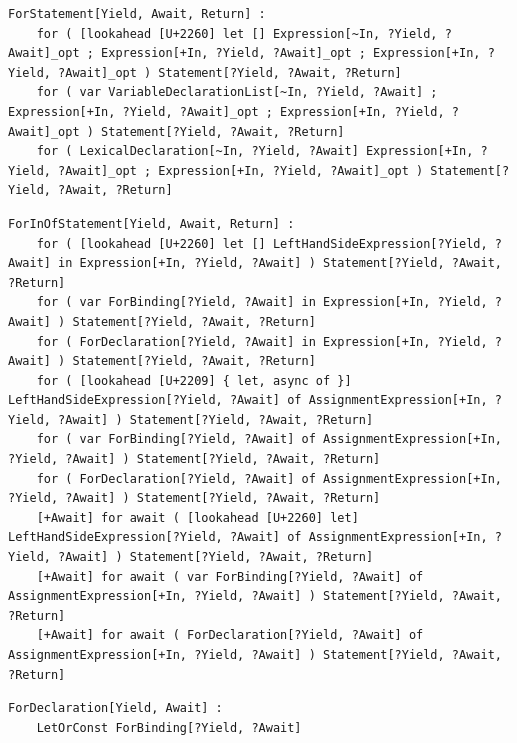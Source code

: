 \noindent\textbf{\texttt{}}\par
\begin{lstlisting}
ForStatement[Yield, Await, Return] :
    for ( [lookahead [U+2260] let [] Expression[~In, ?Yield, ?Await]_opt ; Expression[+In, ?Yield, ?Await]_opt ; Expression[+In, ?Yield, ?Await]_opt ) Statement[?Yield, ?Await, ?Return]
    for ( var VariableDeclarationList[~In, ?Yield, ?Await] ; Expression[+In, ?Yield, ?Await]_opt ; Expression[+In, ?Yield, ?Await]_opt ) Statement[?Yield, ?Await, ?Return]
    for ( LexicalDeclaration[~In, ?Yield, ?Await] Expression[+In, ?Yield, ?Await]_opt ; Expression[+In, ?Yield, ?Await]_opt ) Statement[?Yield, ?Await, ?Return]
\end{lstlisting}

\noindent\textbf{\texttt{}}\par
\begin{lstlisting}
ForInOfStatement[Yield, Await, Return] :
    for ( [lookahead [U+2260] let [] LeftHandSideExpression[?Yield, ?Await] in Expression[+In, ?Yield, ?Await] ) Statement[?Yield, ?Await, ?Return]
    for ( var ForBinding[?Yield, ?Await] in Expression[+In, ?Yield, ?Await] ) Statement[?Yield, ?Await, ?Return]
    for ( ForDeclaration[?Yield, ?Await] in Expression[+In, ?Yield, ?Await] ) Statement[?Yield, ?Await, ?Return]
    for ( [lookahead [U+2209] { let, async of }] LeftHandSideExpression[?Yield, ?Await] of AssignmentExpression[+In, ?Yield, ?Await] ) Statement[?Yield, ?Await, ?Return]
    for ( var ForBinding[?Yield, ?Await] of AssignmentExpression[+In, ?Yield, ?Await] ) Statement[?Yield, ?Await, ?Return]
    for ( ForDeclaration[?Yield, ?Await] of AssignmentExpression[+In, ?Yield, ?Await] ) Statement[?Yield, ?Await, ?Return]
    [+Await] for await ( [lookahead [U+2260] let] LeftHandSideExpression[?Yield, ?Await] of AssignmentExpression[+In, ?Yield, ?Await] ) Statement[?Yield, ?Await, ?Return]
    [+Await] for await ( var ForBinding[?Yield, ?Await] of AssignmentExpression[+In, ?Yield, ?Await] ) Statement[?Yield, ?Await, ?Return]
    [+Await] for await ( ForDeclaration[?Yield, ?Await] of AssignmentExpression[+In, ?Yield, ?Await] ) Statement[?Yield, ?Await, ?Return]
\end{lstlisting}

\noindent\textbf{\texttt{}}\par
\begin{lstlisting}
ForDeclaration[Yield, Await] :
    LetOrConst ForBinding[?Yield, ?Await]
\end{lstlisting}

